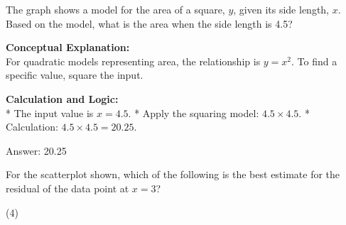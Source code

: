 \documentclass[11pt,paper=a4,answers]{exam}
\begin{document}
\begin{questions}
\question
\begin{center}
\end{center}
The graph shows a model for the area of a square, $y$, given its side length, $x$. Based on the model, what is the area when the side length is 4.5?

\begin{solution}
\textbf{Conceptual Explanation:} \\
For quadratic models representing area, the relationship is $y = x^2$. To find a specific value, square the input.

\vspace{30pt}

\textbf{Calculation and Logic:} \\
* The input value is $x = 4.5$.
* Apply the squaring model: $4.5 \times 4.5$.
* Calculation: $4.5 \times 4.5 = 20.25$.

\vspace{30pt}

Answer: \colorbox{yellow!100}{20.25}
\end{solution}

\vspace{60pt}

\question
\begin{center}
\end{center}
For the scatterplot shown, which of the following is the best estimate for the residual of the data point at $x = 3$?
\begin{tasks}(4)
\end{tasks}


\end{questions}
\end{document}
